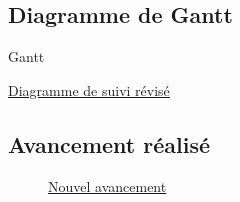 \documentclass{beamer}
\begin{document}
	
	\subsection{Diagramme de Gantt}
	\begin{frame}{Gantt}
		\begin{center}
			\href{run:Images/Gantt_ProjetDiscretSuivi.gif}{Diagramme de suivi révisé}
		\end{center}
	\end{frame}

	\subsection{Avancement réalisé}
	\begin{frame}{\subsecname}
		\begin{figure}
			\href{run:Images/CourbeAvancement.png}{Nouvel avancement}
		\end{figure}
	\end{frame}


\end{document}
